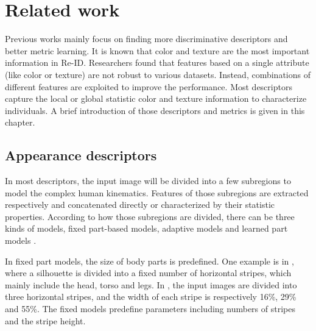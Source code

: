 \chapter{Related work}
Previous works mainly focus on finding more discriminative descriptors and better metric learning. It is known that color and texture are the most important information in Re-ID. Researchers found that features based on a single attribute (like color or texture) are not robust to various datasets. Instead, combinations of different features are exploited to improve the performance. Most descriptors capture the local or global statistic color and texture information to characterize individuals. A brief introduction of those descriptors and metrics is given in this chapter.

\section{Appearance descriptors}
In most descriptors, the input image will be divided into a few subregions to model the complex human kinematics. Features of those subregions are extracted respectively and concatenated directly or characterized by their statistic properties. According to how those subregions are divided, there can be three kinds of models, fixed part-based models, adaptive models and learned part models \cite{Appearancedesc}. 

In fixed part models, the size of body parts is predefined. One example is in \cite{ImportantFeatures, PRDC, REIDSVM}, where a silhouette is divided into a fixed number of horizontal stripes, which mainly include the head, torso and legs. In \cite{AppBasedREID}, the input images are divided into three horizontal stripes, and the width of each stripe is respectively 16\%, 29\% and 55\%.  The fixed models predefine parameters including numbers of stripes and the stripe height. 


